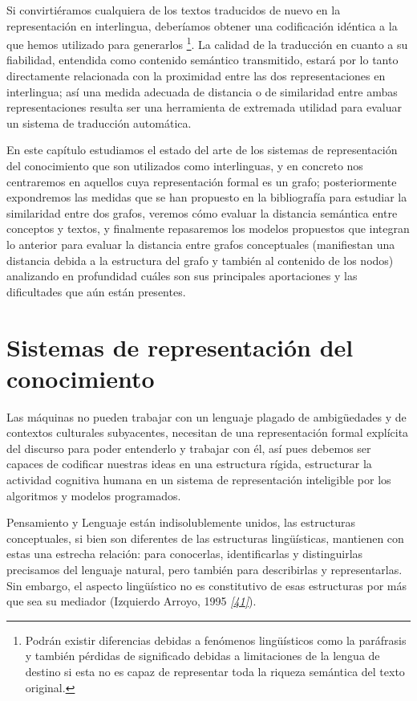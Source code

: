 \documentclass[a4paper,12pt,spanish]{book}
\begin{document}
Si convirtiéramos cualquiera de los textos traducidos de nuevo en la representación
en interlingua, deberíamos obtener una codificación idéntica a la que hemos
utilizado para generarlos \footnote{
Podrán existir diferencias debidas a fenómenos lingüísticos como la paráfrasis y
también pérdidas de significado debidas a limitaciones de la lengua de destino si esta
no es capaz de representar toda la riqueza semántica del texto original.
}. La calidad de la traducción en cuanto a su fiabilidad,
entendida como contenido semántico transmitido, estará por lo tanto directamente
relacionada con la proximidad entre las dos representaciones en interlingua; así
una medida adecuada de distancia o de similaridad entre ambas representaciones resulta
ser una herramienta de extremada utilidad para evaluar un sistema de traducción automática.

En este capítulo estudiamos el estado del arte de los sistemas de representación del
conocimiento que son utilizados como interlinguas, y en concreto nos centraremos en
aquellos cuya representación formal es un grafo; posteriormente expondremos las
medidas que se han propuesto en la bibliografía para estudiar la similaridad entre dos
grafos, veremos cómo evaluar la distancia semántica entre conceptos y textos, y
finalmente repasaremos los modelos propuestos que integran lo anterior para evaluar
la distancia entre grafos conceptuales (manifiestan una distancia debida a la estructura
del grafo y también al contenido de los nodos) analizando en profundidad cuáles son sus
principales aportaciones y las dificultades que aún están presentes.


\section{Sistemas de representación del conocimiento}
\label{1.state-of-the-art/i.representacion-conocimiento::doc}\label{1.state-of-the-art/i.representacion-conocimiento:sistemas-de-representacion-del-conocimiento}
Las máquinas no pueden trabajar con un lenguaje plagado de ambigüedades y de contextos
culturales subyacentes, necesitan de una representación formal explícita del
discurso para poder entenderlo y trabajar con él, así pues debemos ser capaces de
codificar nuestras ideas en una estructura rígida, estructurar la actividad
cognitiva humana en un sistema de representación inteligible por los algoritmos y
modelos programados.

Pensamiento y Lenguaje están indisolublemente unidos, las estructuras conceptuales,
si bien son diferentes de las estructuras lingüísticas, mantienen con estas una
estrecha relación: para conocerlas, identificarlas y distinguirlas precisamos del
lenguaje natural, pero también para describirlas y representarlas. Sin embargo, el
aspecto lingüístico no es constitutivo de esas estructuras por más que sea su
mediador (Izquierdo Arroyo, 1995 \label{1.state-of-the-art/i.representacion-conocimiento:id1}{\hyperref[zreferences:izquierdoarroyo1995]{\emph{{[}41{]}}}}).
\end{document}
